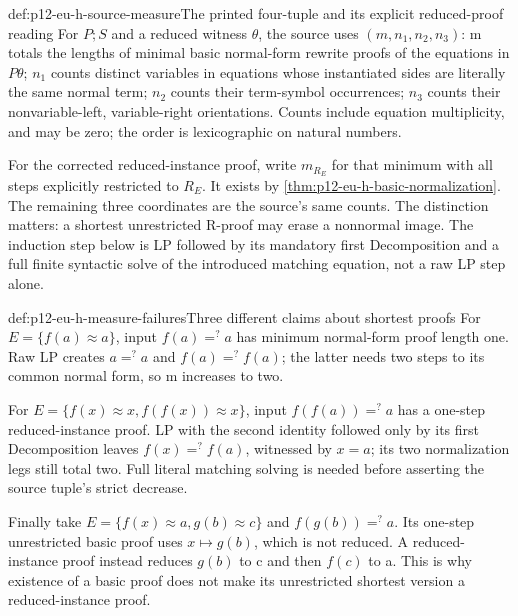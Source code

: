\begin{hbdefinition}{def:p12-eu-h-source-measure}{The printed four-tuple and its explicit reduced-proof reading}
For \(P;S\) and a reduced witness \(\theta\), the source uses
\((m,n_1,n_2,n_3)\): m totals the lengths of minimal basic
normal-form rewrite proofs of the equations in \(P\theta\);
\(n_1\) counts distinct variables in equations whose instantiated
sides are literally the same normal term; \(n_2\) counts their
term-symbol occurrences; \(n_3\) counts their nonvariable-left,
variable-right orientations. Counts include equation multiplicity,
and may be zero; the order is lexicographic on natural numbers.

For the corrected reduced-instance proof, write \(m_{R_E}\) for
that minimum with all steps explicitly restricted to \(R_E\).
It exists by \cref{thm:p12-eu-h-basic-normalization}. The remaining
three coordinates are the source's same counts. The distinction
matters: a shortest unrestricted R-proof may erase a nonnormal image.
The induction step below is LP followed by its mandatory first
Decomposition and a full finite syntactic solve of the introduced
matching equation, not a raw LP step alone.
\cite[Lemma 4.9 proof, pp.~491--492]{BaaderSnyder2001}
\end{hbdefinition}

\begin{hbexample}{def:p12-eu-h-measure-failures}{Three different claims about shortest proofs}
For \(E=\{f(a)\approx a\}\), input \(f(a)=^{?}a\) has
minimum normal-form proof length one. Raw LP creates
\(a=^{?}a\) and \(f(a)=^{?}f(a)\); the latter needs two
steps to its common normal form, so m increases to two.

For \(E=\{f(x)\approx x,f(f(x))\approx x\}\), input
\(f(f(a))=^{?}a\) has a one-step reduced-instance proof. LP
with the second identity followed only by its first Decomposition
leaves \(f(x)=^{?}f(a)\), witnessed by \(x=a\); its two
normalization legs still total two. Full literal matching solving
is needed before asserting the source tuple's strict decrease.

Finally take \(E=\{f(x)\approx a,g(b)\approx c\}\) and
\(f(g(b))=^{?}a\). Its one-step unrestricted basic proof uses
\(x\mapsto g(b)\), which is not reduced. A reduced-instance
proof instead reduces \(g(b)\) to c and then \(f(c)\) to a.
This is why existence of a basic proof does not make its unrestricted
shortest version a reduced-instance proof.
\end{hbexample}

